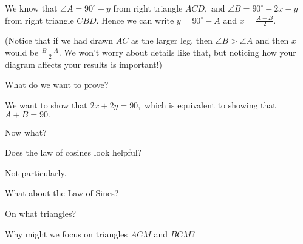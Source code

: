 We know that $\angle A = 90^{\circ} - y$ from right triangle $ACD,$ and $\angle B = 90^{\circ} - 2x - y$ from right triangle $CBD.$ Hence we can write $y = 90^{\circ} - A$ and $x = \frac{A-B}{2}.$

(Notice that if we had drawn $AC$ as the larger leg, then $\angle B > \angle A$ and then $x$ would be $\frac{B-A}{2}.$ We won't worry about details like that, but noticing how your diagram affects your results is important!)

What do we want to prove?




We want to show that $2x+2y = 90,$ which is equivalent to showing that $A + B = 90.$

Now what?

Does the law of cosines look helpful?


Not particularly.

What about the Law of Sines?


On what triangles?



Why might we focus on triangles $ACM$ and $BCM?$



